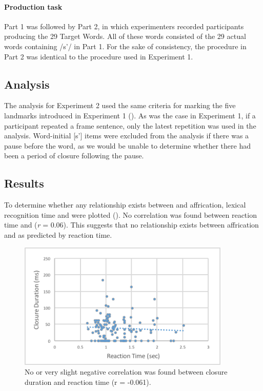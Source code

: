 \documentclass[output=paper
,newtxmath
,modfonts
,nonflat]{langsci/langscibook}
\begin{document}
\paragraph{Production task}

Part 1 was followed by Part 2, in which experimenters recorded participants producing the 29 Target Words. All of these words consisted of the 29 actual words containing /s’/ in Part 1. For the sake of consistency, the procedure in Part 2 was identical to the procedure used in Experiment 1.

\subsection{Analysis}\label{sec:moeng:6.2}

The analysis for Experiment 2 used the same criteria for marking the five landmarks introduced in Experiment 1 (). As was the case in Experiment 1, if a participant repeated a frame sentence, only the latest repetition was used in the analysis. Word-initial [s’] items were excluded from the analysis if there was a pause before the word, as we would be unable to determine whether there had been a period of closure following the pause.

\subsection{Results}\label{sec:moeng:6.3}

To determine whether any relationship exists between  and affrication, lexical recognition time and  were plotted (). No correlation was found between reaction time and  (\textit{r} = 0.06). This suggests that no relationship exists between affrication and  as predicted by reaction time.

\begin{figure}
\includegraphics[width=0.9\textwidth]{figures/fig-moeng-5}
\caption{No or very slight negative correlation was found between closure duration and reaction time (r = -0.061).}
\label{fig:moeng:6}
\end{figure}
\end{document}
